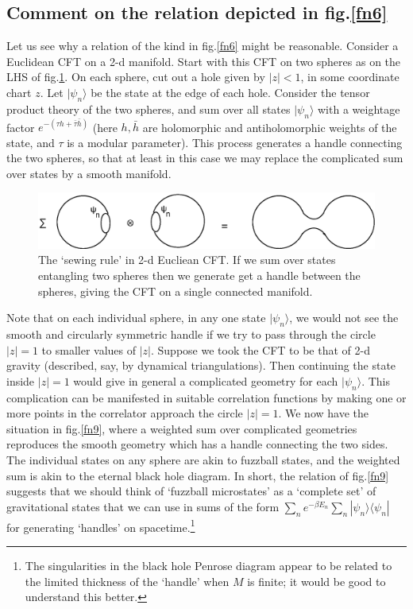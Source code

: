 \documentclass[11pt]{article}
\begin{document}
\subsection{Comment on the relation depicted in fig.\ref{fn6}}

Let us see why a relation of the kind in fig.\ref{fn6} might be reasonable. Consider a Euclidean CFT on a 2-d manifold. Start with this CFT on two spheres as on the LHS of  fig.\ref{fn8}. On each sphere, cut out a hole given by $|z|<1$, in some coordinate chart $z$. Let $|\psi_n\rangle$ be the state at the edge of each hole. Consider the tensor product theory of the two spheres, and sum over all states $|\psi_n\rangle$ with  a weightage factor $e^{-(\tau h+\bar \tau \bar h)}$ (here $h, \bar h$ are holomorphic and antiholomorphic weights of the state, and $\tau$ is a modular parameter). This process generates a handle connecting the two spheres, so that at least in this case we may replace the complicated sum over states by a smooth manifold. 

\begin{figure}[htbp]
\begin{center}
\includegraphics[scale=.75]{fn8.eps}
\caption{{The `sewing rule' in 2-d Eucliean CFT. If we sum over states entangling two spheres  then we generate get a handle between the spheres, giving the CFT on a single connected manifold.}}
\label{fn8}
\end{center}
\end{figure}



Note that on each individual sphere, in any one state $|\psi_n\rangle$, we would not see the smooth and  circularly symmetric handle if we try to pass  through the circle $|z|=1$ to smaller values of $|z|$. Suppose we took the CFT to be that of 2-d gravity (described, say,  by dynamical triangulations). Then continuing the state inside $|z|=1$ would give in general a complicated geometry for each $|\psi_n\rangle$. This complication can be manifested in suitable correlation functions by making one or more points in the correlator approach the circle $|z|=1$. We now have the situation in fig.\ref{fn9}, where a weighted sum over complicated geometries reproduces the smooth geometry which has a handle connecting the two sides. The individual states on any sphere are akin to fuzzball states, and the weighted sum is akin to the eternal black hole diagram. In short, the relation of fig.\ref{fn9} suggests that we should think of `fuzzball microstates' as a  `complete set' of gravitational states that we can use in sums of the form $\sum_n e^{-\beta E_n}\sum_n |\psi_n\rangle\langle \psi_n|$ for generating `handles' on spacetime.\footnote{The singularities in the black hole Penrose diagram appear to be related to the limited thickness of the `handle' when $M$ is finite; it would be good to understand this better.}
\end{document}
